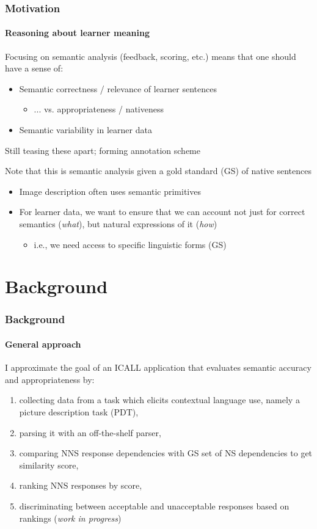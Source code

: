 \documentclass{beamer}
\begin{document}
\begin{frame}
\frametitle{Motivation}
\framesubtitle{Reasoning about learner meaning}


Focusing on semantic analysis (feedback, scoring, etc.) means that one
should have a sense of:
\begin{itemize}
\item Semantic correctness / relevance of learner sentences
  \begin{itemize}
  \item ... vs. appropriateness / nativeness
  \end{itemize}
\item Semantic variability in learner data
\end{itemize}

Still teasing these apart; forming annotation scheme

\bigskip


Note that this is semantic analysis given a gold standard (GS) of
native sentences
\begin{itemize}
\item Image description often uses semantic primitives
  \citep{ortiz:wolff:lapata:15}
\item For learner data, we want to ensure that we can account not just
  for correct semantics (\emph{what}), but natural expressions of it
  (\emph{how})
  \begin{itemize}
  \item i.e., we need access to specific linguistic forms (GS)
  \end{itemize}
\end{itemize}

\end{frame}

\section{Background}

\begin{frame}
\frametitle{Background}
\framesubtitle{General approach}
I approximate the goal of an ICALL application that evaluates semantic accuracy and appropriateness by:
\begin{enumerate}
\item collecting data from a task which elicits contextual language use, namely a picture
description task (PDT),
\item parsing it with an off-the-shelf parser,
\item comparing NNS response dependencies with GS set of NS dependencies to get similarity score,
\item ranking NNS responses by score,
\item discriminating between acceptable and unacceptable responses based on rankings (\textit{work in progress})
\end{enumerate}

\medskip

\end{frame}
\end{document}
